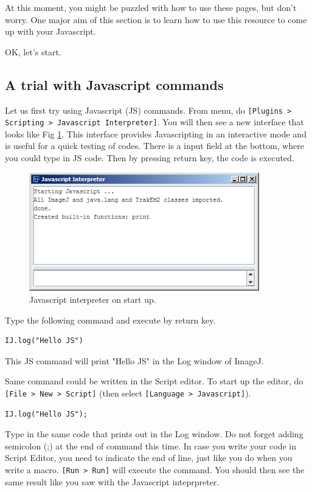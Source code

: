\documentclass[11pt,a4paper,oneside]{report}
\newcommand{\ijmenu}[1]{\texttt{\small#1}}
\begin{document}
At this moment, you might be puzzled with how to use these pages, 
but don't worry. One major aim of this section is to learn how to use this resource 
to come up with your Javascript. 

OK, let's start. 

\subsection{A trial with Javascript commands}
%
Let us first try using Javascript (JS) commands. 
From menu, do \ijmenu{[Plugins > Scripting > Javascript Interpreter]}. 
You will then see a new interface that looks like Fig \ref{fig:JSinterpreter}. 
This interface provides Javascripting in an interactive mode and is useful for 
a quick testing of codes. There is a input field at the bottom, where you could type in JS code. 
Then by pressing return key, the code is executed.  

\begin{figure}[htbp]
\begin{center}
\includegraphics[width=100mm]{fig2/JSinterpreterStasrtUp.png}
\caption{Javascript interpreter on start up.}
\label{fig:JSinterpreter}
\end{center}
\end{figure} 

Type the following command and execute by return key. 
\begin{lstlisting}[numbers=none]
IJ.log("Hello JS")
\end{lstlisting}
This JS command will print "Hello JS" in the Log window of ImageJ.  

Same command could be written in the Script editor. To start up the editor, 
do \ijmenu{[File > New > Script]} (then select \ijmenu{[Language > Javascript]}). 
\begin{lstlisting}[numbers=none]
IJ.log("Hello JS");
\end{lstlisting}
Type in the same code that prints out in the Log window. Do not forget adding semicolon (;) at the end of command this time. In case you write your code in Script Editor, you need to indicate the end of line, just like you do when you write a macro. \ijmenu{[Run > Run]} will execute the command. You should then see the same result like you saw with the Javascript inteprpreter. 
\end{document}
